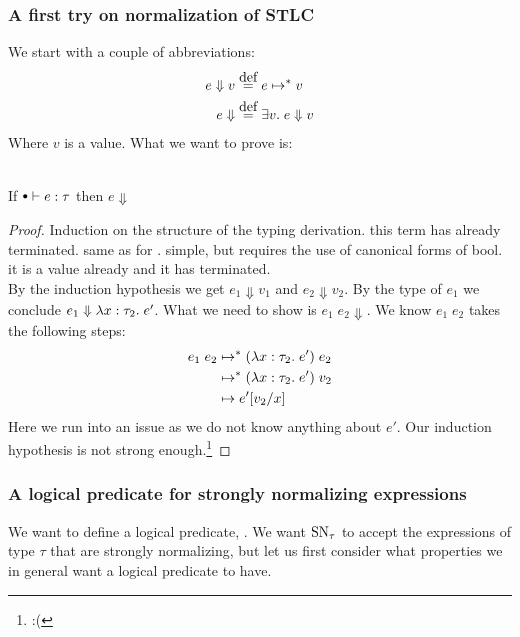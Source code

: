 \subsubsection*{A first try on normalization of STLC}
We start with a couple of abbreviations:
\begin{align*}
  e \Downarrow v & \eqdef e \evaltos v \\
  e \Downarrow   & \eqdef \exists v. \; e \Downarrow v
\end{align*}
Where $v$ is a value.
What we want to prove is:
\begin{strnorm}~\\
  If $\mtenv \vdash e : \tau$ then $e \Downarrow$
\end{strnorm}
\begin{proof} 
Induction on the structure of the typing derivation.
 this term has already terminated.
 same as for \true.
 simple, but requires the use of canonical forms of bool.
 it is a value already and it has terminated.
\case{$ \TApp $} \\
By the induction hypothesis we get $e_1 \Downarrow v_1$ and $e_2 \Downarrow v_2$. By the type of $e_1$ we conclude $e_1 \Downarrow \lambda x : \tau_2 . \; e'$. What we need to show is $e_1 \; e_2 \Downarrow$. We know $e_1 \; e_2$ takes the following steps:
\begin{align*}
  e_1 \; e_2 & \mapsto^{*} (\lambda x : \tau_2 . \; e') \; e_2 \\
            & \mapsto^{*} (\lambda x : \tau_2 . \; e') \; v_2 \\
            & \mapsto e'[v_2/x]
\end{align*}
Here we run into an issue as we do not know anything about $e'$. Our induction hypothesis is not strong enough.\footnote{:(}
\end{proof}
\subsubsection*{A logical predicate for strongly normalizing expressions}
We want to define a logical predicate, . We want $\operatorname{SN}_\tau$ to accept the expressions of type $\tau$ that are strongly normalizing, but let us first consider what properties we in general want a logical predicate to have.

